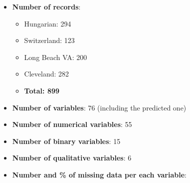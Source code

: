 \documentclass[a4paper,12pt]{article}
\begin{document}
    \begin{itemize}

        \item \textbf{Number of records}:
        \begin{itemize}

            \item Hungarian: 294
            \item Switzerland: 123
            \item Long Beach VA: 200
            \item Cleveland: 282
            \item \textbf{Total: 899}

        \end{itemize}
        \item \textbf{Number of variables}: 76 (including the predicted one)
        \item \textbf{Number of numerical variables}: 55
        \item \textbf{Number of binary variables}: 15
        \item \textbf{Number of qualitative variables}: 6
        \item \textbf{Number and \% of missing data per each variable}:

    \end{itemize}
\end{document}
